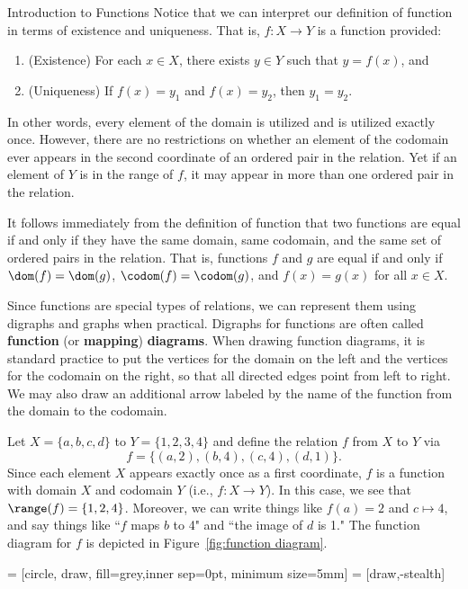 \begin{section}{Introduction to Functions}
Notice that we can interpret our definition of function in terms of existence and uniqueness.  That is, $f:X\to Y$ is a function provided:
\begin{enumerate}
\item (Existence) For each $x\in X$, there exists $y\in Y$ such that $y=f(x)$, and
\item (Uniqueness) If $f(x)=y_1$ and $f(x)=y_2$, then $y_{1}=y_{2}$.
\end{enumerate}
In other words, every element of the domain is utilized and is utilized exactly once. However, there are no restrictions on whether an element of the codomain ever appears in the second coordinate of an ordered pair in the relation.  Yet if an element of $Y$ is in the range of $f$, it may appear in more than one ordered pair in the relation.

It follows immediately from the definition of function that two functions are equal if and only if they have the same domain, same codomain, and the same set of ordered pairs in the relation. That is, functions $f$ and $g$ are equal if and only if $\dom(f)=\dom(g)$, $\codom(f)=\codom(g)$, and $f(x)=g(x)$ for all $x\in X$.

Since functions are special types of relations, we can represent them using digraphs and graphs when practical. Digraphs for functions are often called \textbf{function} (or \textbf{mapping}) \textbf{diagrams}. When drawing function diagrams, it is standard practice to put the vertices for the domain on the left and the vertices for the codomain on the right, so that all directed edges point from left to right. We may also draw an additional arrow labeled by the name of the function from the domain to the codomain.

\begin{example}\label{ex:function}
Let $X=\{a,b,c,d\}$ to $Y=\{1,2,3,4\}$ and define the relation $f$ from $X$ to $Y$ via
\[
f=\{(a,2),(b,4),(c,4),(d,1)\}.
\]
Since each element $X$ appears exactly once as a first coordinate, $f$ is a function with domain $X$ and codomain $Y$ (i.e., $f:X\to Y$). In this case, we see that $\range(f)=\{1,2,4\}$.  Moreover, we can write things like $f(a)=2$ and $c\mapsto 4$, and say things like ``$f$ maps $b$ to 4" and ``the image of $d$ is 1."  The function diagram for $f$ is depicted in Figure~\ref{fig:function diagram}.
\end{example}

 = [circle, draw, fill=grey,inner sep=0pt, minimum size=5mm]
 = [draw,-stealth]


\end{section}
